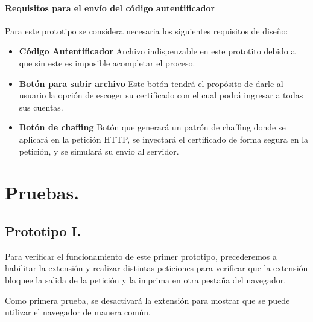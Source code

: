 \documentclass[12pt, a4paper, titlepage]{report}
\begin{document}
    			     \subsubsection{Requisitos para el envío del código autentificador}   
    			        Para este prototipo se considera necesaria los siguientes requisitos de diseño:
    			        \begin{itemize}
    			            \item \textbf{Código Autentificador} Archivo indispenzable en este prototito debido a que sin este es imposible acompletar el proceso.
    
    			            \item \textbf{Botón para subir archivo} Este botón tendrá el propósito de darle al usuario la opción de escoger su certificado con el cual podrá ingresar a todas sus cuentas.
    			            
    			            \item \textbf{Botón de chaffing} Botón que generará un patrón de chaffing donde se aplicará en la petición HTTP, se inyectará el certificado de forma segura en la petición, y se simulará su envio al servidor.
    			           
    			        \end{itemize}
			        
    \chapter{\textcolor{azulescom}{Pruebas.}}
        \section{Prototipo I.}
            Para verificar el funcionamiento de este primer prototipo, precederemos a habilitar la extensión y realizar distintas peticiones para verificar que la extensión bloquee la salida de la petición y la imprima en otra pestaña del navegador.
            
            Como primera prueba, se desactivará la extensión para mostrar que se puede utilizar el navegador de manera común.
            
\end{document}
